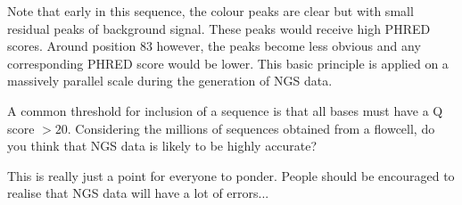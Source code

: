 Note that early in this sequence, the colour peaks are clear but with small residual peaks of background signal.
These peaks would receive high PHRED scores.
Around position 83 however, the peaks become less obvious and any corresponding PHRED score would be lower.
This basic principle is applied on a massively parallel scale during the generation of NGS data.\\

\begin{questions}
A common threshold for inclusion of a sequence is that all bases must have a Q score $>20$.
Considering the millions of sequences obtained from a flowcell, do you think that NGS data is likely to be highly accurate?\\
\begin{answer}
This is really just a point for everyone to ponder.
People should be encouraged to realise that NGS data will have a lot of errors...
\end{answer}
\end{questions}

\clearpage
